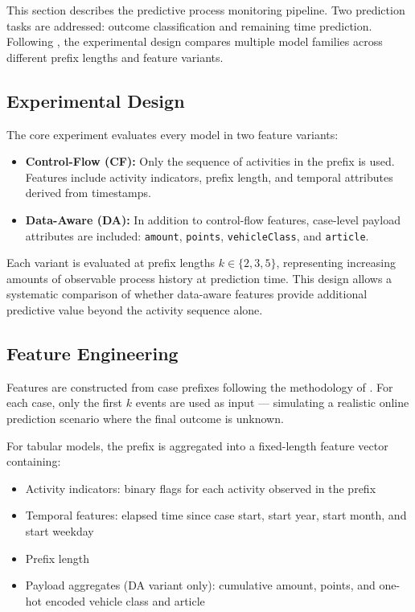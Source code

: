 
This section describes the predictive process monitoring pipeline. Two prediction tasks are addressed: outcome classification and remaining time prediction. Following \textcite{teinemaa2019}, the experimental design compares multiple model families across different prefix lengths and feature variants.

\subsection{Experimental Design}

The core experiment evaluates every model in two feature variants:

\begin{itemize}
    \item \textbf{Control-Flow (CF):} Only the sequence of activities in the prefix is used. Features include activity indicators, prefix length, and temporal attributes derived from timestamps.
    \item \textbf{Data-Aware (DA):} In addition to control-flow features, case-level payload attributes are included: \texttt{amount}, \texttt{points}, \texttt{vehicleClass}, and \texttt{article}.
\end{itemize}

Each variant is evaluated at prefix lengths $k \in \{2, 3, 5\}$, representing increasing amounts of observable process history at prediction time. This design allows a systematic comparison of whether data-aware features provide additional predictive value beyond the activity sequence alone.

\subsection{Feature Engineering}
\label{sub:feature_engineering}

Features are constructed from case prefixes following the methodology of \textcite{teinemaa2019}. For each case, only the first $k$ events are used as input — simulating a realistic online prediction scenario where the final outcome is unknown.

For tabular models, the prefix is aggregated into a fixed-length feature vector containing:
\begin{itemize}
    \item Activity indicators: binary flags for each activity observed in the prefix
    \item Temporal features: elapsed time since case start, start year, start month, and start weekday
    \item Prefix length
    \item Payload aggregates (DA variant only): cumulative amount, points, and one-hot encoded vehicle class and article
\end{itemize}

